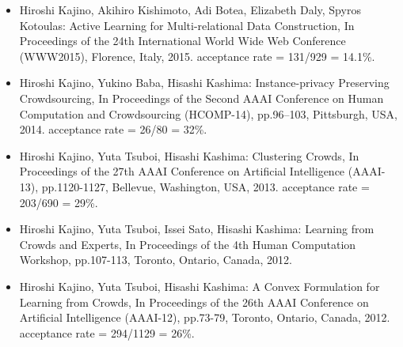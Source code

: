 \documentclass[a4paper,9pt]{article}
\begin{document}
\begin{itemize}
 \item Hiroshi Kajino, Akihiro Kishimoto, Adi Botea, Elizabeth Daly, Spyros Kotoulas: Active Learning for Multi-relational Data Construction, In Proceedings of the 24th International World Wide Web Conference (WWW2015), Florence, Italy, 2015. acceptance rate = 131/929 = 14.1\%.
 \item Hiroshi Kajino, Yukino Baba, Hisashi Kashima: Instance-privacy Preserving Crowdsourcing, In Proceedings of the Second AAAI Conference on Human Computation and Crowdsourcing (HCOMP-14), pp.96--103, Pittsburgh, USA, 2014. acceptance rate = 26/80 = 32\%.
 \item Hiroshi Kajino, Yuta Tsuboi, Hisashi Kashima: Clustering Crowds, In Proceedings of the 27th AAAI Conference on Artificial Intelligence (AAAI-13), pp.1120-1127, Bellevue, Washington, USA, 2013. acceptance rate = 203/690 = 29\%.
 \item Hiroshi Kajino, Yuta Tsuboi, Issei Sato, Hisashi Kashima: Learning from Crowds and Experts, In Proceedings of the 4th Human Computation Workshop, pp.107-113, Toronto, Ontario, Canada, 2012.
 \item Hiroshi Kajino, Yuta Tsuboi, Hisashi Kashima: A Convex Formulation for Learning from Crowds, In Proceedings of the 26th AAAI Conference on Artificial Intelligence (AAAI-12), pp.73-79, Toronto, Ontario, Canada, 2012. acceptance rate = 294/1129 = 26\%.
\end{itemize}


\end{document}
